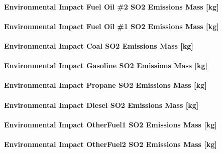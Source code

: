 \paragraph{Environmental Impact Fuel Oil \#2 SO2 Emissions Mass {[}kg{]}}\label{environmental-impact-fuel-oil-2-so2-emissions-mass-kg}

\paragraph{Environmental Impact Fuel Oil \#1 SO2 Emissions Mass {[}kg{]}}\label{environmental-impact-fuel-oil-1-so2-emissions-mass-kg}

\paragraph{Environmental Impact Coal SO2 Emissions Mass {[}kg{]}}\label{environmental-impact-coal-so2-emissions-mass-kg}

\paragraph{Environmental Impact Gasoline SO2 Emissions Mass {[}kg{]}}\label{environmental-impact-gasoline-so2-emissions-mass-kg}

\paragraph{Environmental Impact Propane SO2 Emissions Mass {[}kg{]}}\label{environmental-impact-propane-so2-emissions-mass-kg}

\paragraph{Environmental Impact Diesel SO2 Emissions Mass {[}kg{]}}\label{environmental-impact-diesel-so2-emissions-mass-kg}

\paragraph{Environmental Impact OtherFuel1 SO2 Emissions Mass {[}kg{]}}\label{environmental-impact-otherfuel1-so2-emissions-mass-kg}

\paragraph{Environmental Impact OtherFuel2 SO2 Emissions Mass {[}kg{]}}\label{environmental-impact-otherfuel2-so2-emissions-mass-kg}

